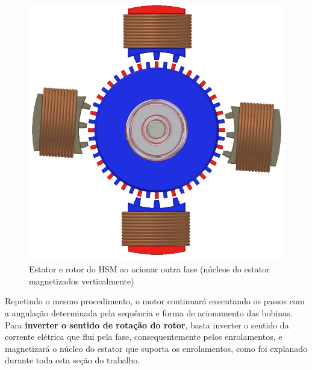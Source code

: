 	\begin{figure}[!h]
		\centering 
		\includegraphics[scale=0.3]{images/hsm_operation/etapa2}
		\caption{Estator e rotor do HSM ao acionar outra fase (núcleos do estator magnetizados verticalmente)}
		\label{acionamento2}
	\end{figure}
	
	Repetindo o mesmo procedimento, o motor continuará executando os passos com a angulação determinada pela sequência e forma de acionamento das bobinas. Para \textbf{inverter o sentido de rotação do rotor}, basta inverter o sentido da corrente elétrica que flui pela fase, consequentemente pelos enrolamentos, e magnetizará o núcleo do estator que suporta os enrolamentos, como foi explanado durante toda esta seção do trabalho. 
	
